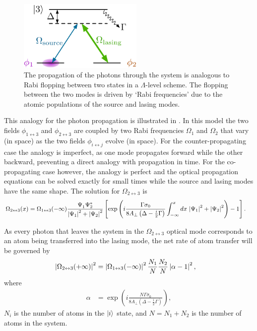 \begin{figure}
    \centering
    \includegraphics[width=6cm]{DualModel}
    \caption{The propagation of the photons through the system is analogous to Rabi flopping between two states in a $\Lambda$-level scheme.  The flopping between the two modes is driven by `Rabi frequencies' due to the atomic populations of the source and lasing modes.}
    \label{OpticalPumping:DualModel}
\end{figure}

This analogy for the photon propagation is illustrated in .  In this model the two fields $\phi_{1\leftrightarrow 3}$ and $\phi_{2 \leftrightarrow 3}$ are coupled by two Rabi frequencies $\Omega_1$ and $\Omega_2$ that vary (in space) as the two fields $\phi_{i \leftrightarrow j}$ evolve (in space).  For the counter-propagating case the analogy is imperfect, as one mode propagates forward while the other backward, preventing a direct analogy with propagation in time.  For the co-propagating case however, the analogy is perfect and the optical propagation equations can be solved exactly for small times while the source and lasing modes have the same shape.  The solution for $\Omega_{2\leftrightarrow 3}$ is
\begin{align}
    \Omega_{2\leftrightarrow 3}(x) &= \Omega_{1\leftrightarrow 3}(-\infty) \frac{\Psi_1^{\phantom{*}} \Psi_2^*}{\left|\Psi_1\right|^2 + \left|\Psi_2\right|^2} \left[\exp \left( i \frac{\Gamma \sigma_0}{8 A_\perp\left(\Delta - \frac{i}{2} \Gamma\right)}\int_{-\infty}^x dx\, \left|\Psi_1\right|^2 + \left|\Psi_2\right|^2\right) -1 \right].
\end{align}

As every photon that leaves the system in the $\Omega_{2\leftrightarrow 3}$ optical mode corresponds to an atom being transferred into the lasing mode, the net rate of atom transfer will be governed by
\begin{align}
    \abs{\Omega_{2\leftrightarrow 3}(+\infty)}^2 &= \abs{\Omega_{1\leftrightarrow 3}(-\infty)}^2 \frac{N_1}{N} \frac{N_2}{N} \abs{\alpha - 1}^2, \label{OpticalPumping:OverlappingCondensates:Omega2Infinity}
\end{align}
where
\begin{align}
    \alpha &= \exp \left( i \frac{N\Gamma \sigma_0}{8 A_\perp\left(\Delta - \frac{i}{2} \Gamma\right)}\right),
\end{align}
$N_i$ is the number of atoms in the ${\left|i\right>}$ state, and $N = N_1 + N_2$ is the number of atoms in the system.  

